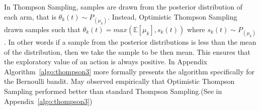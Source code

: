 In Thompson Sampling, samples are drawn from the posterior distribution of each arm, that is $\theta_k(t)\sim P_{(\mu_k)}$. Instead, Optimistic Thompson Sampling drawn samples such that $\theta_k(t) = max(\mathbb{E}[\mu_k],s_k(t))$ where $s_k(t)\sim P_{(\mu_k)}$. In other words if a sample from the posterior distributions is less than the mean of the distribution, then we take the sample to be then mean. This ensures that the exploratory value of an action is always positive. In Appendix Algorithm~\ref{algo:thompson3} more formally presents the algorithm specifically for the Bernoulli bandit. May\cite{may2012optimistic} observed empirically that Optimistic Thompson Sampling performed better than standard Thompson Sampling.(See in Appendix~\ref{algo:thompson3})
